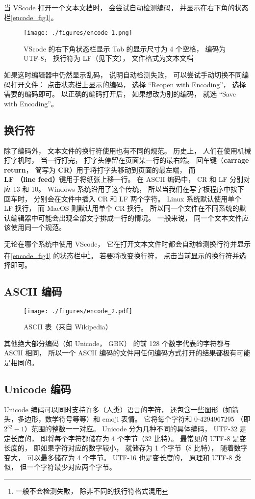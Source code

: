 当 VScode 打开一个文本文档时， 会尝试自动检测编码， 并显示在右下角的状态栏\autoref{encode_fig1}。
\begin{figure}[ht]
\centering
\texttt{[image: ./figures/encode\_1.png]}
\caption{VScode 的右下角状态栏显示 Tab 的显示尺寸为 4 个空格， 编码为 UTF-8， 换行符为 LF（见下文）， 文件格式为文本文档} \label{encode_fig1}
\end{figure}
如果这时编辑器中仍然显示乱码， 说明自动检测失败， 可以尝试手动切换不同编码打开文件： 点击状态栏上显示的编码， 选择 “Reopen with Encoding”， 选择需要的编码即可。 以正确的编码打开后， 如果想改为别的编码， 就选 “Save with Encoding”。

\subsection{换行符}
除了编码外， 文本文件的换行符使用也有不同的规范。 历史上， 人们在使用机械打字机时， 当一行打完， 打字头停留在页面某一行的最右端。 回车键（\textbf{carrage return}， 简写为 \textbf{CR}）用于将打字头移动到页面的最左端， 而 \textbf{LF （line feed）}键用于将纸张上移一行。 在 ASCII 编码中， CR 和 LF 分别对应 13 和 10。 Windows 系统沿用了这个传统， 所以当我们在写字板程序中按下回车时， 分别会在文件中插入 CR 和 LF 两个字符。 Linux 系统默认使用单个 LF 换行， 而 MacOS 则默认用单个 CR 换行。 所以同一个文件在不同系统的默认编辑器中可能会出现全部文字排成一行的情况。 一般来说， 同一个文本文件应该使用同一个规范。

无论在哪个系统中使用 VScode， 它在打开文本文件时都会自动检测换行符并显示在\autoref{encode_fig1} 的状态栏中\footnote{一般不会检测失败， 除非不同的换行符格式混用}。 若要将改变换行符， 点击当前显示的换行符并选择即可。

\subsection{ASCII 编码}
\begin{figure}[ht]
\centering
\texttt{[image: ./figures/encode\_2.pdf]}
\caption{ASCII 表（来自 Wikipedia）} \label{encode_fig2}
\end{figure}


其他绝大部分编码（如 Unicode， GBK） 的前 128 个数字代表的字符都与 ASCII 相同， 所以一个 ASCII 编码的文件用任何编码方式打开的结果都极有可能是相同的。

\subsection{Unicode 编码}
Unicode 编码可以同时支持许多（人类）语言的字符， 还包含一些图形（如箭头，多边形，数学符号等等）和 emoji 表情。 它将每个字符和 0-4294967295 （即 $2^{32}-1$）范围的整数一一对应。 Unicode 分为几种不同的具体编码， UTF-32 是定长度的， 即将每个字符都储存为 4 个字节（32 比特）。 最常见的 UTF-8 是变长度的， 即如果字符对应的数字较小， 就储存为 1 个字节（8 比特）， 随着数字变大， 可以最多储存为 4 个字节。 UTF-16 也是变长度的， 原理和 UTF-8 类似， 但一个字符最少对应两个字节。

